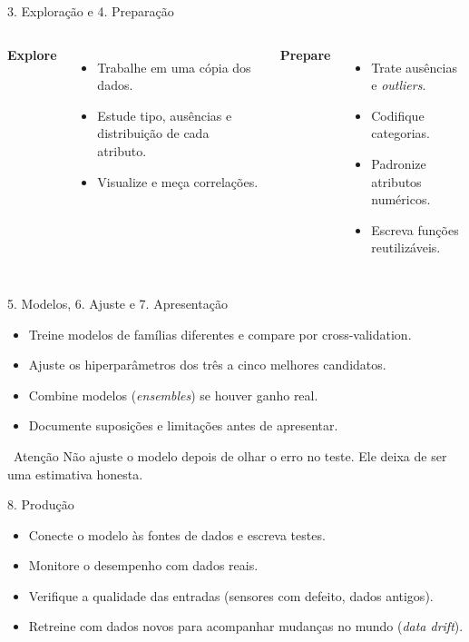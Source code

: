 \documentclass[10pt]{beamer}
\newenvironment{atencao}{\begin{alertblock}{\faExclamationTriangle\ Atenção}}{\end{alertblock}}
\begin{document}
\begin{frame}{3. Exploração e 4. Preparação}
\begin{columns}[T]
\textbf{Explore}
\begin{itemize}
 \item Trabalhe em uma cópia dos dados.
 \item Estude tipo, ausências e distribuição de cada atributo.
 \item Visualize e meça correlações.
\end{itemize}
\textbf{Prepare}
\begin{itemize}
 \item Trate ausências e \textit{outliers}.
 \item Codifique categorias.
 \item Padronize atributos numéricos.
 \item Escreva funções reutilizáveis.
\end{itemize}
\end{columns}
\end{frame}

\begin{frame}{5. Modelos, 6. Ajuste e 7. Apresentação}
\begin{itemize}
 \item Treine modelos de famílias diferentes e compare por cross-validation.
 \item Ajuste os hiperparâmetros dos três a cinco melhores candidatos.
 \item Combine modelos (\textit{ensembles}) se houver ganho real.
 \item Documente suposições e limitações antes de apresentar.
\end{itemize}
\begin{atencao}
Não ajuste o modelo depois de olhar o erro no teste. Ele deixa de ser uma estimativa honesta.
\end{atencao}
\end{frame}

\begin{frame}{8. Produção}
\begin{itemize}
 \item Conecte o modelo às fontes de dados e escreva testes.
 \item Monitore o desempenho com dados reais.
 \item Verifique a qualidade das entradas (sensores com defeito, dados antigos).
 \item Retreine com dados novos para acompanhar mudanças no mundo (\textit{data drift}).
\end{itemize}
\end{frame}
\end{document}
